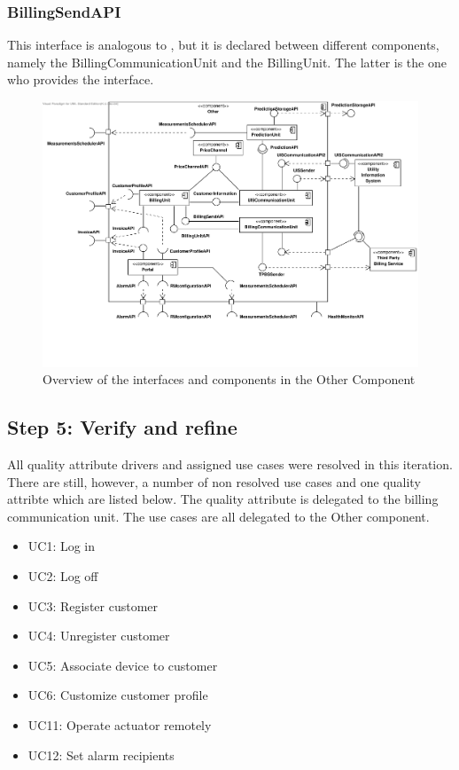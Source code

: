 \subsubsection{BillingSendAPI}

\npar This interface is analogous to , but it
is declared between different components, namely the BillingCommunicationUnit
and the BillingUnit. The latter is the one who provides the interface.

\begin{figure}[H]
	\begin{centering}
		\includegraphics[width=\textwidth]{figs/add-it10-interfaces.pdf}
		\caption{Overview of the interfaces and components in the Other Component}
		\label{fig:it10/interfaces}
	\end{centering}
\end{figure}

\subsection{Step 5: Verify and refine}
\label{add:it10/verification}

\npar All quality attribute drivers and assigned use cases were resolved in
this iteration. There are still, however, a number of non resolved use cases and
one quality attribte which are listed below. The quality attribute is
delegated to the billing communication unit. The use cases are all delegated to
the Other component.


\begin{itemize}
	\item UC1: Log in
	\item UC2: Log off
	\item UC3: Register customer
	\item UC4: Unregister customer
	\item UC5: Associate device to customer
	\item UC6: Customize customer profile
	\item UC11: Operate actuator remotely
	\item UC12: Set alarm recipients
\end{itemize}
